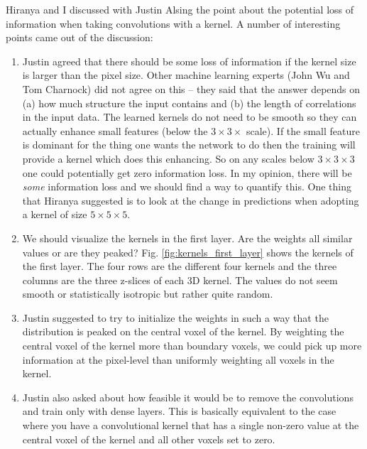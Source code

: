 \documentclass[11pt]{article}
\begin{document}
Hiranya and I discussed with Justin Alsing the point about the potential loss of information when taking convolutions with a kernel. A number of interesting points came out of the discussion:
\begin{enumerate}
\item Justin agreed that there should be some loss of information if the kernel size is larger than the pixel size. Other machine learning experts (John Wu and Tom Charnock) did not agree on this -- they said that the answer depends on (a) how much structure the input contains and (b) the length of correlations in the input data. The learned kernels do not need to be smooth so they can actually enhance small features (below the $3\times3\times$ scale). If the small feature is dominant for the thing one wants the network to do then the training will provide a kernel which does this enhancing. So on any scales below $3\times3\times3$ one could potentially get zero information loss. In my opinion, there will be \textit{some} information loss and we should find a way to quantify this. One thing that Hiranya suggested is to look at the change in predictions when adopting a kernel of size $5\times5\times5$.
\item We should visualize the kernels in the first layer. Are the weights all similar values or are they peaked? Fig. \ref{fig:kernels_first_layer} shows the kernels of the first layer. The four rows are the different four kernels and the three columns are the three z-slices of each 3D kernel. The values do not seem smooth or statistically isotropic but rather quite random.
\item Justin suggested to try to initialize the weights in such a way that the distribution is peaked on the central voxel of the kernel. By weighting the central voxel of the kernel more than boundary voxels, we could pick up more information at the pixel-level than uniformly weighting all voxels in the kernel.
\item Justin also asked about how feasible it would be to remove the convolutions and train only with dense layers. This is basically equivalent to the case where you have a convolutional kernel that has a single non-zero value at the central voxel of the kernel and all other voxels set to zero.

\end{enumerate}
\end{document}
